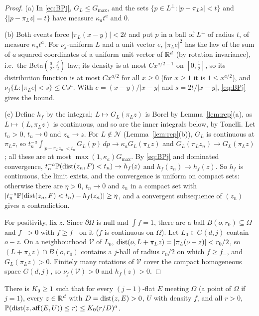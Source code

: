 \documentclass[11pt]{article}
\begin{document}
\begin{proof}
(a) In \eqref{eq:BPj}, $G_L\le G_{\max}$, and the sets $\{p\in L^\perp:|p-\pi_Lz|<t\}$ and $\{|p-\pi_Lz|=t\}$ have measure $\kappa_at^a$ and
$0$.

(b) Both events force $|\pi_L(x-y)|<2t$ and put $p$ in a ball of $L^\perp$ of radius $t$, of measure $\kappa_at^a$. For $\nu_j$-uniform
$L$ and a unit vector $e$, $|\pi_Le|^2$ has the law of the sum of $a$ squared coordinates of a uniform unit vector of $\mathbb{R}^d$ (by
rotation invariance), i.e.\ the Beta$(\frac a2,\frac j2)$ law; its density is at most $Cx^{a/2-1}$ on $[0,\frac12]$, so its
distribution function is at most $Cx^{a/2}$ for all $x\ge0$ (for $x\ge1$ it is $1\le x^{a/2}$), and $\nu_j\{L:|\pi_Le|<s\}\le Cs^a$. With $e=(x-y)/|x-y|$ and $s=2t/|x-y|$,
\eqref{eq:BPj} gives the bound.

(c) Define $h_f$ by the integral; $L\mapsto G_L(\pi_Lz)$ is Borel by Lemma~\ref{lem:rep}(a), as $L\mapsto(L,\pi_Lz)$ is continuous, and so
are the inner integrals below, by Tonelli. Let $t_n>0$, $t_n\to0$ and $z_n\to z$. For $L\notin\mathcal N$ (Lemma~\ref{lem:rep}(b)), $G_L$ is continuous at
$\pi_Lz$, so $t_n^{-a}\int_{|p-\pi_Lz_n|<t_n}G_L(p)\,dp\to\kappa_aG_L(\pi_Lz)$ and $G_L(\pi_Lz_n)\to G_L(\pi_Lz)$; all these are at most
$\max(1,\kappa_a)G_{\max}$. By \eqref{eq:BPj} and dominated convergence, $t_n^{-a}\mathbb{P}(\operatorname{dist}(z_n,F)<t_n)\to h_f(z)$ and $h_f(z_n)\to h_f(z)$. So $h_f$ is
continuous, the limit exists, and the convergence is uniform on compact sets: otherwise there are $\eta>0$, $t_n\to0$ and $z_n$ in a
compact set with $|t_n^{-a}\mathbb{P}(\operatorname{dist}(z_n,F)<t_n)-h_f(z_n)|\ge\eta$, and a convergent subsequence of $(z_n)$ gives a contradiction.

For positivity, fix $z$. Since $\partial\Omega$ is null and $\int f=1$, there are a ball $B(o,r_0)\subseteq\Omega$ and $f_->0$ with $f\ge f_-$
on it ($f$ is continuous on $\Omega$). Let $L_0\in G(d,j)$ contain $o-z$. On a neighbourhood $\mathcal V$ of $L_0$, $\operatorname{dist}(o,L+\pi_Lz)=|\pi_L(o-z)|<r_0/2$,
so $(L+\pi_Lz)\cap B(o,r_0)$ contains a $j$-ball of radius $r_0/2$ on which $f\ge f_-$, and $G_L(\pi_Lz)>0$. Finitely many rotations of
$\mathcal V$ cover the compact homogeneous space $G(d,j)$, so $\nu_j(\mathcal V)>0$ and $h_f(z)>0$.
\end{proof}

\begin{lemma}\label{lem:flat}
There is $K_0\ge1$ such that for every $(j-1)$-flat $E$ meeting $\Omega$ (a point of $\Omega$ if $j=1$), every $z\in\mathbb{R}^d$ with
$D=\operatorname{dist}(z,E)>0$, $U$ with density $f$, and all $r>0$, $\mathbb{P}(\operatorname{dist}(z,\operatorname{aff}(E,U))\le r)\le K_0(r/D)^a$.
\end{lemma}
\end{document}
